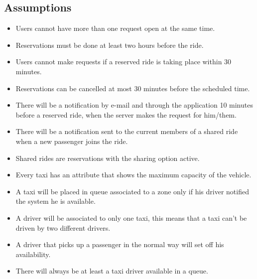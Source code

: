 \subsection{Assumptions}
	\begin{itemize}
		\item Users cannot have more than one request open at the same time.
		\item Reservations must be done at least two hours before the ride.
		\item Users cannot make requests if a reserved ride is taking place within 30 minutes.
		\item Reservations can be cancelled at most 30 minutes before the scheduled time.
		\item There will be a notification by e-mail and through the application 10 minutes before a reserved ride, when the server makes the request for him/them.
		\item There will be a notification sent to  the current members of a shared ride when a new passenger joins the ride.
		\item Shared rides are reservations with the sharing option active.
		\item Every taxi has an attribute that shows the maximum capacity of the vehicle.
		\item A taxi will be placed in queue associated to a zone only if his driver notified the system he is available.
		\item A driver will be associated to only one taxi, this means that a taxi can't be driven by two different drivers.
		\item A driver that picks up a passenger in the normal way will set off his availability.
		\item There will always be at least a taxi driver available in a queue.
	\end{itemize}
	